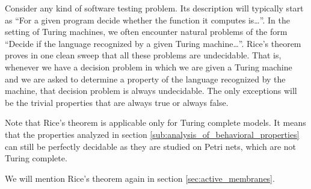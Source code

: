 Consider any kind of software testing problem. Its description will typically start as ``For a given program decide whether the function it computes is\ldots''. In the setting of Turing machines, we often encounter natural problems of the form ``Decide if the language recognized by a given Turing machine\ldots''.  Rice's theorem \cite{Rice53Theorem} proves in one clean sweep that all these problems are undecidable. That is, whenever we have a decision problem in which we are given a Turing machine and we are asked to determine a property of the language recognized by the machine, that decision problem is always undecidable. The only exceptions will be the trivial properties that are always true or always false.

Note that Rice's theorem is applicable only for Turing complete models. It means that the properties analyzed in section \ref{sub:analysis_of_behavioral_properties} can still be perfectly decidable as they are studied on Petri nets, which are not Turing complete.

We will mention Rice's theorem again in section \ref{sec:active_membranes}.